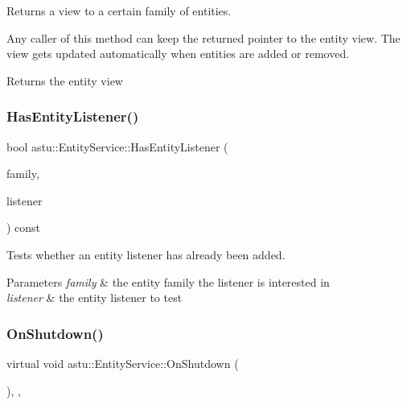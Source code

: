 Returns a view to a certain family of entities.

Any caller of this method can keep the returned pointer to the entity view. The view gets updated automatically when entities are added or removed.

\begin{DoxyReturn}{Returns}
the entity view 
\end{DoxyReturn}
\mbox{\label{classastu_1_1EntityService_a333b2d932a0ce15687c76b6c361a7e82}} 
\subsubsection{\texorpdfstring{Has\+Entity\+Listener()}{HasEntityListener()}}
{\footnotesize\ttfamily bool astu\+::\+Entity\+Service\+::\+Has\+Entity\+Listener (\begin{DoxyParamCaption}\item[{const \hyperlink{classastu_1_1EntityFamily}{Entity\+Family} \&}]{family,  }\item[{std\+::shared\+\_\+ptr$<$ \hyperlink{classastu_1_1IEntityListener}{I\+Entity\+Listener} $>$}]{listener }\end{DoxyParamCaption}) const}

Tests whether an entity listener has already been added.


\begin{DoxyParams}{Parameters}
{\em family} & the entity family the listener is interested in \\
\hline
{\em listener} & the entity listener to test \\
\hline
\end{DoxyParams}
\mbox{\label{classastu_1_1EntityService_ac998c4d02a90460a129c8f2e0586d728}} 
\subsubsection{\texorpdfstring{On\+Shutdown()}{OnShutdown()}}
{\footnotesize\ttfamily virtual void astu\+::\+Entity\+Service\+::\+On\+Shutdown (\begin{DoxyParamCaption}{ }\end{DoxyParamCaption})\hspace{0.3cm}{\ttfamily [override]}, {\ttfamily [protected]}, {\ttfamily [virtual]}}

